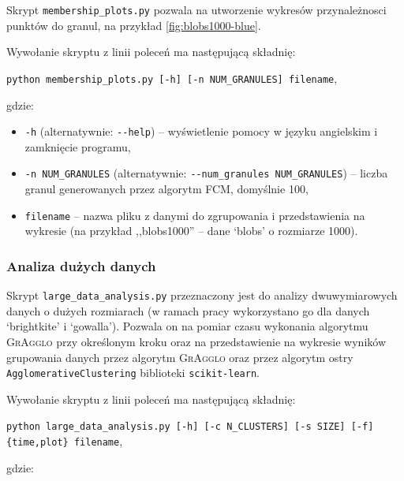 \documentclass[a4paper,twoside,12pt]{book}
\newcommand{\dataset}[1]{`#1'}
\newcommand{\blobs}{\dataset{blobs}}
\newcommand{\gowalla}{\dataset{gowalla}}
\newcommand{\brightkite}{\dataset{brightkite}}
\newcommand{\procedura}[1]{\textsc{#1}}
\newcommand{\MojAlg}{\procedura{GrAgglo}}
\begin{document}
\begin{appendices}
Skrypt \lstinline|membership_plots.py| pozwala na utworzenie wykresów przynależnosci punktów do granul, na przykład \ref{fig:blobs1000-blue}.

Wywołanie skryptu z linii poleceń ma następującą składnię:

\lstinline|python membership_plots.py [-h] [-n NUM_GRANULES] filename|,

\noindent gdzie:

\begin{itemize}
	\item \lstinline|-h| (alternatywnie: \lstinline|--help|) -- wyświetlenie pomocy w języku angielskim i zamknięcie programu,
	\item \lstinline|-n NUM_GRANULES| (alternatywnie: \lstinline|--num_granules NUM_GRANULES|) -- liczba granul generowanych przez algorytm FCM, domyślnie 100,
	\item \lstinline|filename|  -- nazwa pliku z danymi do zgrupowania i przedstawienia na wykresie (na przykład ,,blobs1000'' -- dane \blobs{} o rozmiarze 1000).
\end{itemize}

\subsubsection*{Analiza dużych danych}

Skrypt \lstinline|large_data_analysis.py| przeznaczony jest do analizy dwuwymiarowych danych o dużych rozmiarach (w ramach pracy wykorzystano go dla danych \brightkite{} i \gowalla{}). Pozwala on na pomiar czasu wykonania algorytmu \MojAlg{} przy określonym kroku oraz na przedstawienie na wykresie wyników grupowania danych przez algorytm \MojAlg{} oraz przez algorytm ostry \texttt{Ag\-glo\-me\-ra\-ti\-ve\-Clu\-s\-te\-ring} biblioteki \texttt{scikit-learn}.

Wywołanie skryptu z linii poleceń ma następującą składnię:

\lstinline|python large_data_analysis.py [-h] [-c N_CLUSTERS] [-s SIZE] [-f] {time,plot} filename|,

\noindent gdzie:


\end{appendices}
\end{document}
